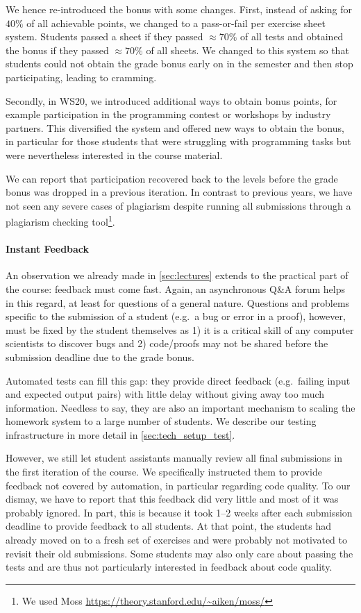 We hence re-introduced the bonus with some changes.
First, instead of asking for $40\%$ of all achievable points,
we changed to a pass-or-fail per exercise sheet system.
Students passed a sheet if they
passed $\approx 70\%$ of all tests
and obtained the bonus if they passed $\approx 70\%$ of all sheets.
We changed to this system so that students
could not obtain the grade bonus early on in the semester and then stop participating,
leading to cramming.

Secondly, in WS20, we introduced additional ways to
obtain bonus points,
for example participation in the programming contest or workshops by industry partners.
This diversified the system and offered new ways
to obtain the bonus,
in particular for those students that were struggling
with programming tasks but were nevertheless interested in the course material.

We can report that participation recovered
back to the levels before the grade bonus was dropped in a previous iteration.
In contrast to previous years,
we have not seen any severe cases of plagiarism despite
running all submissions through a plagiarism checking tool\footnote{We used Moss \url{https://theory.stanford.edu/~aiken/moss/}}.

\paragraph{Instant Feedback}
An observation we already made in \cref{sec:lectures}
extends to the practical part of the course:
feedback must come fast.
Again, an asynchronous Q\&A forum helps in this regard,
at least for questions of a general nature.
Questions and problems specific to the submission of a student (e.g.\ a bug or error in a proof),
however, must be fixed by the student themselves as 1) it is a critical skill of any computer scientists to discover bugs and 2) code/proofs may not be shared before the submission deadline due to the grade bonus.

Automated tests can fill this gap:
they provide direct feedback (e.g.\ failing input and expected output pairs) with little delay
without giving away too much information.
Needless to say, they are also an important mechanism
to scaling the homework system to a large number of students.
We describe our testing infrastructure in more detail in \cref{sec:tech_setup_test}.

However, we still let student assistants manually review all final submissions
in the first iteration of the course.
We specifically instructed them to provide feedback not covered by automation,
in particular regarding code quality.
To our dismay, we have to report that this feedback did very little and
most of it was probably ignored.
In part, this is because it took 1--2 weeks after each submission deadline to provide feedback to all students.
At that point, the students had already moved on to a fresh set of exercises and were probably not motivated to revisit their old submissions.
Some students may also only care about passing the tests
and are thus not particularly interested in feedback about code quality.

